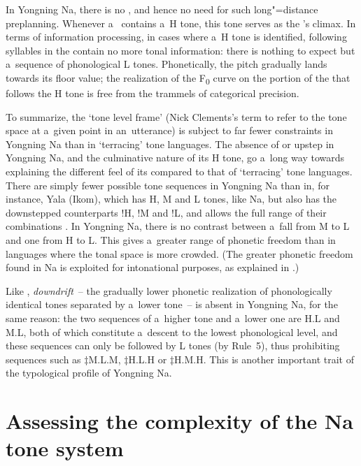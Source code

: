 In Yongning Na, there is no , and hence no need for such long"=distance preplanning. Whenever a~ contains a~H tone, this tone serves as the 's climax. In terms of information processing, in cases where a~H tone is identified, following syllables in the  contain no more tonal information: there is nothing to expect but a~sequence of phonological L tones. Phonetically, the pitch gradually lands towards its floor value; the realization of the F\textsubscript{0} curve on the portion of the  that follows the H tone is free from the trammels of categorical precision.

To summarize, the `tone level frame' (Nick Clements's term to refer to the tone space at a~given point in an~utterance) is subject to far fewer constraints in Yongning Na than in `terracing' tone languages. The absence of  or upstep in Yongning Na, and the culminative nature of its H tone, go a~long way towards explaining the different feel of its  compared to that of `terracing' tone languages. There are simply fewer possible tone sequences in Yongning Na than in, for instance, Yala (Ikom), which has H, M and L tones, like Na, but also has the downstepped counterparts !H, !M and !L, and allows the full range of their combinations \citep{armstrong1968}. In Yongning Na, there is no contrast between a~fall from M to L and one from H to L. This gives a~greater range of phonetic freedom than in languages where the tonal space is more crowded. (The greater phonetic freedom found in Na is exploited for intonational purposes, as explained in .)

{\largerpage}

Like , \textit{downdrift}~-- the gradually lower phonetic realization of phonologically identical tones separated by a~lower tone~-- is absent in Yongning Na, for the same reason: the two sequences of a~higher tone and a~lower one are H.L and M.L, both of which constitute a~descent to the lowest phonological level, and these sequences can only be followed by L tones (by Rule~5), thus prohibiting sequences such as $\ddagger${\kern2pt}M.L.M, $\ddagger${\kern2pt}H.L.H or $\ddagger${\kern2pt}H.M.H. This is another important trait of the typological profile of Yongning Na.


\section{Assessing the complexity of the Na tone system}
\label{sec:morphophonologicalcomplexity}

